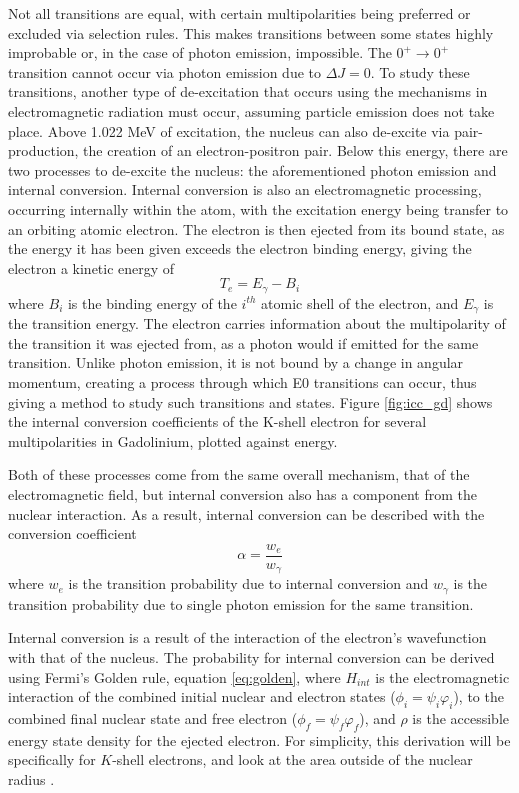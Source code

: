 Not all transitions are equal, with certain multipolarities being preferred or excluded via selection rules. This makes transitions between some states highly improbable or, in the case of photon emission, impossible. The $0^+\rightarrow0^+$ transition cannot occur via photon emission due to $\Delta J = 0$. To study these transitions, another type of de-excitation that occurs using the mechanisms in electromagnetic radiation must occur, assuming particle emission does not take place. Above 1.022 MeV of excitation, the nucleus can also de-excite via pair-production, the creation of an electron-positron pair. Below this energy, there are two processes to de-excite the nucleus: the aforementioned photon emission and internal conversion. Internal conversion  is also an electromagnetic processing, occurring internally within the atom, with the excitation energy being transfer to an orbiting atomic electron. The electron is then ejected from its bound state, as the energy it has been given exceeds the electron binding energy, giving the electron a kinetic energy of 
\begin{equation}
    T_e = E_{\gamma}-B_i
\end{equation} 
where $B_i$ is the binding energy of the $i^{th}$ atomic shell of the electron, and $E_{\gamma}$ is the transition energy. The electron carries information about the multipolarity of the transition it was ejected from, as a photon would if emitted for the same transition. Unlike photon emission, it is not bound by a change in angular momentum, creating a process through which E0 transitions can occur, thus giving a method to study such transitions and states. Figure \ref{fig:icc_gd} shows the internal conversion coefficients of the K-shell electron for several multipolarities in Gadolinium, plotted against energy.



Both of these processes come from the same overall mechanism, that of the electromagnetic field, but internal conversion also has a component from the nuclear interaction. As a result, internal conversion can be described with the conversion coefficient
\begin{equation}
\label{eq:conv_coeff}
    \alpha = \frac{w_e}{w_\gamma}
\end{equation}
where $w_e$ is the transition probability due to internal conversion and $w_\gamma$ is the transition probability due to single photon emission for the same transition.

Internal conversion is a result of the interaction of the electron's wavefunction with that of the nucleus. The probability for internal conversion can be derived using Fermi's Golden rule, equation \ref{eq:golden}, where $H_{int}$ is the electromagnetic interaction of the combined initial nuclear and electron states ($\phi_i=\psi_i\varphi_i$), to the combined final nuclear state and free electron ($\phi_f=\psi_f\varphi_f$), and $\rho$ is the accessible energy state density for the ejected electron. For simplicity, this derivation will be specifically for $K$-shell electrons, and look at the area outside of the nuclear radius \citep{roy67:_e0, blatt79:_emradiation, segre77:_icradiation}.

